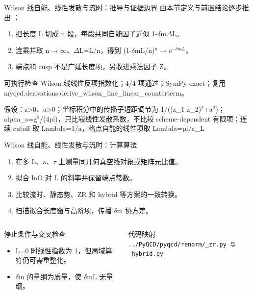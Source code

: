 \begin{frame}[t]{Wilson 线自能、线性发散与流时：推导与证据边界}
\footnotesize
{}\quad 由本节定义与前置结论逐步推出 ：
\begin{enumerate}
\item 把长度 L 切成 n 段，每段共同自能因子近似 1-\ensuremath{\delta}m\ensuremath{\Delta}L。
\item 连乘并取 n\ensuremath{\rightarrow}\ensuremath{\infty}、\ensuremath{\Delta}L=L/\allowbreak{}n，得到 (1-\ensuremath{\delta}mL/\allowbreak{}n)\ensuremath{^{n}}\ensuremath{\rightarrow}e\ensuremath{^{-\delta{}mL}}。
\item 端点和 cusp 不是广延长度项，另收进乘法因子 Z。
\end{enumerate}\begin{block}{可执行检查}
\quad Wilson 线线性反项指数化；4/4 项通过；SymPy exact；复用 myqcd.derivations.derive\_wilson\_line\_linear\_counterterm。
\par\scriptsize 假设：z>0、a>0；坐标积分中的传播子短距调节为 1/\allowbreak{}((z\_1-z\_2)\ensuremath{^{2}}+a\ensuremath{^{2}})；alpha\_s=g\ensuremath{^{2}}/\allowbreak{}(4pi)，只比较线性发散系数，不比较 scheme-dependent 有限项；连续 cutoff 取 Lambda=1/\allowbreak{}a，格点自能的线性项取 Lambda=pi/\allowbreak{}a\_L
\end{block}
\end{frame}

\begin{frame}[t]{Wilson 线自能、线性发散与流时：计算算法}
\footnotesize
{}\begin{enumerate}
\item 在多 L、a、\ensuremath{\tau} 上测量同几何真空线对象或矩阵元比值。
\item 拟合 lnO 对 L 的斜率并保留端点常数。
\item 比较流时、静态势、ZR 和 hybrid 等方案的一致转换。
\item 扫描拟合长度窗与高阶项，传播 \ensuremath{\delta}m 协方差。
\end{enumerate}\begin{columns}[T,onlytextwidth]
\begin{block}{停止条件与交叉检查}\scriptsize\begin{itemize}
\item[\CheckMark] L=0 时线性指数为 1，但局域算符仍可需重整化。
\item[\CheckMark] \ensuremath{\delta}m 的量纲为质量，使 \ensuremath{\delta}mL 无量纲。
\end{itemize}\end{block}
\begin{block}{代码映射}
\scriptsize \texttt{.\allowbreak{}.\allowbreak{}/\allowbreak{}PyQCD/\allowbreak{}pyqcd/\allowbreak{}renorm/\allowbreak{}\_\allowbreak{}zr.\allowbreak{}py 与 \_\allowbreak{}hybrid.\allowbreak{}py}
\end{block}\end{columns}\end{frame}


